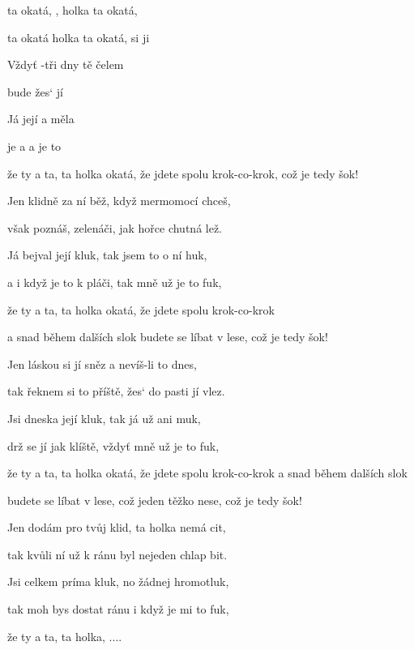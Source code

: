 

\zr
{} ta okatá,  ,
holka ta okatá,  

 ta okatá  
holka ta okatá,  si ji 
\kr

\zs
Vždyť -tři dny  tě  čelem 

 bude  žes`  jí 

Já  její  a  měla 

je  a  a  je to 

že ty a ta, ta holka okatá, že jdete spolu krok-co-krok,
což je tedy šok!
\ks

\zr \kr

\zs
Jen klidně za ní běž, když mermomocí chceš,

však poznáš, zelenáči, jak hořce chutná lež.

Já bejval její kluk, tak jsem to o ní huk,

a i když je to k pláči, tak mně už je to fuk,

že ty a ta, ta holka okatá, že jdete spolu krok-co-krok

a snad během dalších slok budete se líbat v lese,
což je tedy šok!
\ks

\zr \kr

\zs
Jen láskou si jí sněz a nevíš-li to dnes,

tak řeknem si to příště, žes` do pasti jí vlez.

Jsi dneska její kluk, tak já už ani muk,

drž se jí jak klíště, vždyť mně už je to fuk,

že ty a ta, ta holka okatá, že jdete spolu krok-co-krok
a snad během dalších slok

budete se líbat v lese, což jeden těžko nese, což je tedy šok!
\ks

\zr \kr

\zs
Jen dodám pro tvůj klid, ta holka nemá cit,

tak kvůli ní už k ránu byl nejeden chlap bit.

Jsi celkem príma kluk, no žádnej hromotluk,

tak moh bys dostat ránu i když je mi to fuk,

že ty a ta, ta holka, ....
\ks

\kp







